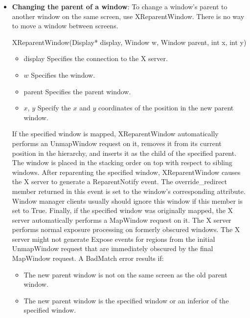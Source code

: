 \documentclass{report}
\begin{document}
    \pagebreak 
    \begin{itemize}
        \item \textbf{Changing the parent of a window}: To change a window’s parent to another window on the same screen, use XReparentWindow. There is no way to move a window between screens.
            \bigbreak \noindent 
            \begin{cppcode}
            XReparentWindow(Display* display, Window w, Window parent, int x, int y)
            \end{cppcode}
            \begin{itemize}
                \item display Specifies the connection to the X server.
                \item $w$ Specifies the window.
                \item parent Specifies the parent window.
                \item $x$, $y$ Specify the $x$ and $y$ coordinates of the position in the new parent window.
            \end{itemize}
            If the specified window is mapped, XReparentWindow automatically performs an UnmapWindow request on it, removes it from its current position in the hierarchy, and inserts it as the child of the specified parent. The window is placed in the stacking order on top with respect to sibling windows.
            \bigbreak \noindent 
            After reparenting the specified window, XReparentWindow causes the X server to generate a ReparentNotify event. The override\_redirect member returned in this event is set to the window’s corresponding attribute. Window manager clients usually should ignore this window if this member is set to True. Finally, if the specified window was originally mapped, the X server automatically performs a MapWindow request on it.
            \bigbreak \noindent 
            The X server performs normal exposure processing on formerly obscured windows. The X server might not generate Expose events for regions from the initial UnmapWindow request that are immediately obscured by the final MapWindow request. A BadMatch error results if:
            \begin{itemize}
                \item The new parent window is not on the same screen as the old parent window.
                \item The new parent window is the specified window or an inferior of the specified window.

\end{itemize}
\end{itemize}
\end{document}
